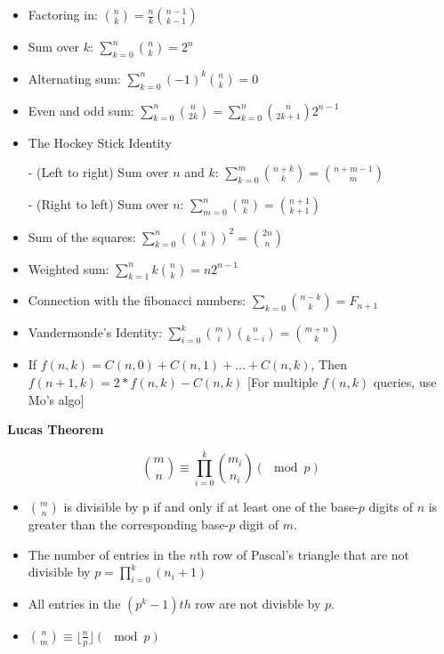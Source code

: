 \begin{itemize}
  \item Factoring in: \( \binom{n}{k} = \frac{n}{k} \binom{n - 1}{k - 1} \)

  \item Sum over \( k \): \( \sum_{k = 0}^n \binom{n}{k} = 2^n \)

  \item Alternating sum: \( \sum_{k = 0}^n (-1)^k \binom{n}{k} = 0 \)

  \item Even and odd sum: \( \sum_{k = 0}^n \binom{n}{2k} = \sum_{k = 0}^n \binom{n}{2k + 1} 2^{n - 1} \)

  \item The Hockey Stick Identity

     - (Left to right) Sum over \( n \) and \( k \): \( \sum_{k = 0}^m \binom{n + k}{k} = \binom{n + m - 1}{m} \)

     - (Right to left) Sum over \( n \): \( \sum_{m = 0}^n \binom{m}{k} = \binom{n + 1}{k + 1} \)

  \item Sum of the squares: \( \sum_{k = 0}^n (\binom{n}{k})^2 = \binom{2n}{n} \)

  \item Weighted sum: \( \sum_{k = 1}^n k \binom{n}{k} = n2^{n - 1} \)

  \item Connection with the fibonacci numbers: \( \sum_{k = 0}\binom{n - k}{k} = F_{n + 1} \)

  \item Vandermonde's Identity: \( \sum_{i = 0}^k \binom{m}{i} \binom{n}{k - i} = \binom{m + n}{k} \)
  \item If \( f(n, k) = C(n, 0) + C(n, 1) + ... + C(n, k) \), Then \( f(n + 1, k) = 2 * f(n, k) - C(n, k) \) [For multiple \( f(n, k) \) queries, use Mo's algo]
\end{itemize}

\textbf{Lucas Theorem}

\[ \binom{m}{n} \equiv \prod_{i = 0}^k \binom{m_i}{n_i}   (\mod p) \]

\begin{itemize}
  \item \( \binom{m}{n} \) is divisible by p if and only if at least one of the base-\(p\) digits of \( n \) is greater than the corresponding base-\( p \) digit of \( m \).

  \item The number of entries in the \( n \)th row of Pascal's triangle that are not divisible by \( p  = \prod_{i = 0}^k (n_i + 1) \)

  \item All entries in the \( (p^{k} - 1)th \) row are not divisble by \( p \).
  \item \( \binom{n}{m} \equiv \lfloor \frac{n}{p} \rfloor (\mod p) \)
\end{itemize}

